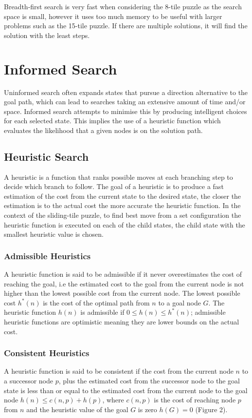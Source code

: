 \documentclass[final]{cmpreport}
\begin{document}
Breadth-first search is very fast when considering the 8-tile puzzle as the search space is small, however it uses too much memory to be useful with larger problems such as the 15-tile puzzle. If there are multiple solutions, it will find the solution with the least steps.


\section{Informed Search}
Uninformed search often expands states that pursue a direction alternative to the goal path, which can lead to searches taking an extensive amount of time and/or space. Informed search attempts to minimise this by producing intelligent choices for each selected state. This implies the use of a heuristic function which evaluates the likelihood that a given nodes is on the solution path.



\subsection{Heuristic Search} \label{sec1}
 A heuristic is a function that ranks possible moves at each branching step to decide which branch to follow. The goal of a heuristic is to produce a fast estimation of the cost from the current state to the desired state, the closer the estimation is to the actual cost the more accurate the heuristic function. In the context of the sliding-tile puzzle, to find best move from a set configuration the heuristic function is executed on each of the child states, the child state with the smallest heuristic value is chosen.
 


\subsubsection{Admissible Heuristics}
A heuristic function is said to be admissible if it never overestimates the cost of reaching the goal, i.e the estimated cost to the goal from the current node is not higher than the lowest possible cost from the current node. The lowest possible cost $h^*(n)$ is the cost of the optimal path from $n$ to a goal node $G$. The heuristic function $h(n)$ is admissible if $0 \leq h(n) \leq h^*(n)$; admissible heuristic functions are optimistic meaning they are lower bounds on the actual cost.

\subsubsection{Consistent Heuristics}
 A heuristic function is said to be consistent if the cost from the current node $n$ to a successor node $p$, plus the estimated cost from the successor node to the goal state is less than or equal to the estimated cost from the current node to the goal node $h(n)\leq c(n,p) + h(p)$, where $c(n,p)$ is the cost of reaching node $p$ from $n$ and the heuristic value of the goal $G$ is zero $h(G)=0$ (Figure 2). 
\end{document}

